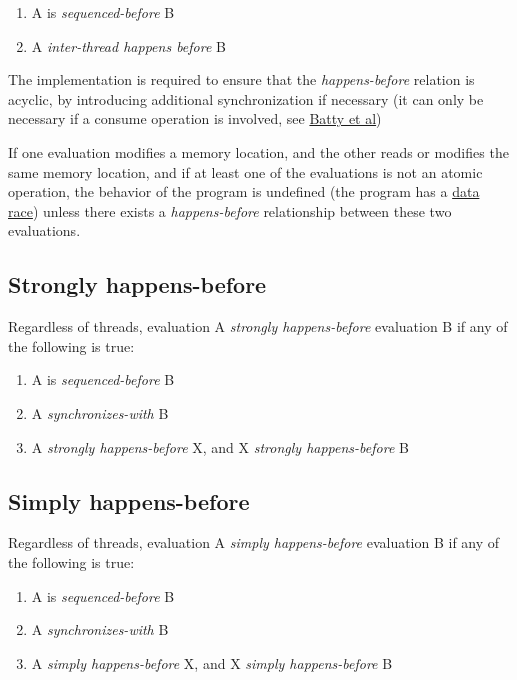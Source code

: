 \documentclass[
]{article}
\begin{document}
\begin{enumerate}
\def\labelenumi{\arabic{enumi})}
\item
  A is \emph{sequenced-before} B
\item
  A \emph{inter-thread happens before} B
\end{enumerate}

The implementation is required to ensure that the \emph{happens-before}
relation is acyclic, by introducing additional synchronization if
necessary (it can only be necessary if a consume operation is involved,
see \href{http://www.cl.cam.ac.uk/~pes20/cpp/popl085ap-sewell.pdf}{Batty
et al})

If one evaluation modifies a memory location, and the other reads or
modifies the same memory location, and if at least one of the
evaluations is not an atomic operation, the behavior of the program is
undefined (the program has a
\href{https://en.cppreference.com/w/cpp/language/memory_model}{data
race}) unless there exists a \emph{happens-before} relationship between
these two evaluations.

\hypertarget{strongly-happens-before}{%
\subsection{Strongly happens-before}\label{strongly-happens-before}}

Regardless of threads, evaluation A \emph{strongly happens-before}
evaluation B if any of the following is true:

\begin{enumerate}
\def\labelenumi{\arabic{enumi})}
\item
  A is \emph{sequenced-before} B
\item
  A \emph{synchronizes-with} B
\item
  A \emph{strongly happens-before} X, and X \emph{strongly
  happens-before} B
\end{enumerate}

\hypertarget{simply-happens-before}{%
\subsection{Simply happens-before}\label{simply-happens-before}}

Regardless of threads, evaluation A \emph{simply happens-before}
evaluation B if any of the following is true:

\begin{enumerate}
\def\labelenumi{\arabic{enumi})}
\item
  A is \emph{sequenced-before} B
\item
  A \emph{synchronizes-with} B
\item
  A \emph{simply happens-before} X, and X \emph{simply happens-before} B
\end{enumerate}
\end{document}
